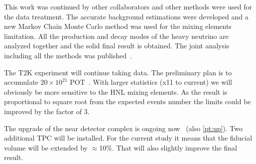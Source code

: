 \documentclass[../main.tex]{subfiles}
\begin{document}
This work was continued by other collaborators and other methods were used for the data treatment. The accurate background estimations were developed and a new Markov Chain Monte Carlo method was used for the mixing elements limitation. All the production and decay modes of the heavy neutrino are analyzed together and the solid final result is obtained. The joint analysis including all the methods was published~\cite{Abe2019c}.

The T2K experiment will continue taking data. The preliminary plan is to accumulate $20\times10^{21}$ POT~\cite{Abe2016e}. With larger statistics (x11 to current) we will obviously be more sensitive to the HNL mixing elements. As the result is proportional to square root from the expected events number the limits could be improved by the factor of 3.

The upgrade of the near detector complex is ongoing now~\cite{Abe2019} (also \autoref{pt:up}). Two additional TPC will be installed. For the current study it means that the fiducial volume will be extended by $\approx$10\%. That will also slightly improve the final result.
\end{document}
